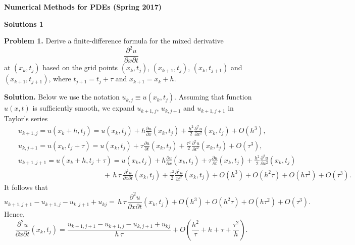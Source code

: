 \documentclass[10pt]{article}
\def\pr{{\partial}}
\begin{document}
\begin{center}
{\large{\bf Numerical Methods for PDEs (Spring 2017)}}
\end{center}


\begin{center}
{\large{\bf Solutions 1}}
\end{center}


\centerline{}


\vskip 0.5cm \noindent
{\bf Problem 1.}
Derive a finite-difference
formula for the mixed derivative
\[
\frac{\partial^2 u}{\partial x\partial t}
\]
at $(x_{k},t_{j})$ based on the grid points $(x_{k},t_{j})$,
$(x_{k+1},t_{j})$, $(x_{k},t_{j+1})$ and $(x_{k+1},t_{j+1})$,
where $t_{j+1}=t_{j}+\tau$ and $x_{k+1}=x_{k}+h$.



\vskip 0.5cm
\noindent
{\bf Solution.} Below we use the notation $u_{k,j}\equiv u(x_{k},t_{j})$.
Assuming that function $u(x,t)$ is sufficiently smooth, we expand $u_{k+1,j}$,
$u_{k,j+1}$ and $u_{k+1,j+1}$ in Taylor's series
\begin{eqnarray}
&&u_{k+1,j}=u(x_{k}+h,t_{j})=u(x_{k},t_{j})+ h\frac{\pr
u}{\pr x}(x_{k},t_{j}) + \frac{h^{2}}{2}\frac{\pr^{2} u}{\pr
x^{2}}(x_{k},t_{j})+O(h^3), \nonumber \\
&&u_{k,j+1}=u(x_{k},t_{j}+\tau)=u(x_{k},t_{j})+ \tau\frac{\pr
u}{\pr t}(x_{k},t_{j}) + \frac{\tau^{2}}{2}\frac{\pr^{2} u}{\pr
t^{2}}(x_{k},t_{j})+O(\tau^3), \nonumber \\
&&u_{k+1,j+1}=u(x_{k}+h,t_{j}+\tau)=u(x_{k},t_{j})+
h\frac{\pr u}{\pr x}(x_{k},t_{j}) + \tau\frac{\pr u}{\pr t}(x_{k},t_{j})
+ \frac{h^{2}}{2}\frac{\pr^{2} u}{\pr x^{2}}(x_{k},t_{j})  \nonumber \\
&&\quad\quad\quad\quad\quad\quad\quad\quad\quad\quad\quad\quad
+ \, h \, \tau \, \frac{\pr^{2} u}{\pr x \pr t}(x_{k},t_{j})
+ \frac{\tau^{2}}{2}\frac{\pr^{2} u}{\pr t^{2}}(x_{k},t_{j})
+O(h^3)+O(h^2\tau)+O(h \tau^2)+O(\tau^3). \nonumber
\end{eqnarray}
It follows that
\[
u_{k+1,j+1}-u_{k+1,j}-u_{k,j+1}+u_{kj}=\, h \, \tau \, \frac{\pr^{2} u}{\pr x \pr t}(x_{k},t_{j})
+O(h^3)+O(h^2\tau)+O(h \tau^2)+O(\tau^3).
\]
Hence,
\[
\frac{\pr^{2} u}{\pr x \pr t}(x_{k},t_{j})=\frac{u_{k+1,j+1}-u_{k+1,j}-u_{k,j+1}+u_{kj}}{h \, \tau}+
O\left(\frac{h^2}{\tau}+h+\tau+\frac{\tau^2}{h}\right).
\]
\end{document}
